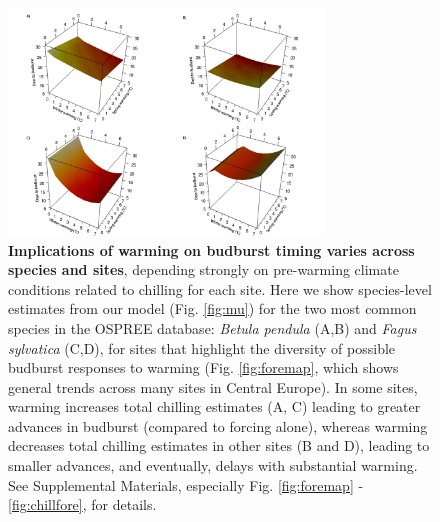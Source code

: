 \documentclass{article}
\begin{document}
\begin{figure}[h!]
\centering
\noindent \includegraphics[width=0.75\textwidth]{..//..//analyses/bb_analysis/figures/forecasting/tempforecastbothspp_1_7_degwarm_3D_utah.png}
\caption{\textbf{Implications of warming on budburst timing varies across species and sites}, depending strongly on pre-warming climate conditions related to chilling for each site. Here we show species-level estimates from our model (Fig. \ref{fig:mu}) for the two most common species in the OSPREE database: \emph{Betula pendula} (A,B) and \emph{Fagus sylvatica} (C,D), for sites that highlight the diversity of possible budburst responses to warming (Fig. \ref{fig:foremap}, which shows general trends across many sites in Central Europe). In some sites, warming increases total chilling estimates (A, C) leading to greater advances in budburst (compared to forcing alone), whereas warming decreases total chilling estimates in other sites (B and D), leading to smaller advances, and eventually, delays with substantial warming. See Supplemental Materials, especially Fig. \ref{fig:foremap} - \ref{fig:chillfore}, for details.}
\label{fig:fore}
\end{figure}

\end{document}
